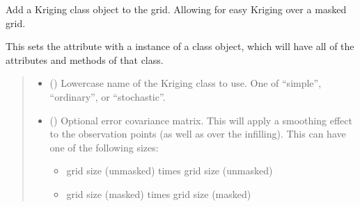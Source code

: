 \documentclass[letterpaper,10pt,english]{sphinxmanual}
\begin{document}
\begin{fulllineitems}
\begin{fulllineitems}
\end{fulllineitems}


\begin{fulllineitems}
\label{\detokenize{grid:glomar_gridding.grid.Grid.kriging}}
\pysigstartsignatures
\pysiglinewithargsret
{}
{\sphinxparamcomma {}}
{}
\pysigstopsignatures
\sphinxAtStartPar
Add a Kriging class object to the grid. Allowing for easy Kriging over
a masked grid.

\sphinxAtStartPar
This sets the  attribute with a instance of a
 class object, which will have
all of the attributes and methods of that class.
\begin{quote}\begin{description}
\begin{itemize}
\item {}
\sphinxAtStartPar
{} () \textendash{} Lower\sphinxhyphen{}case name of the Kriging class to use. One of “simple”,
“ordinary”, or “stochastic”.

\item {}
\sphinxAtStartPar
{} () \textendash{}
\sphinxAtStartPar
Optional error covariance matrix. This will apply a smoothing
effect to the observation points (as well as over the infilling).
This can have one of the following sizes:
\begin{itemize}
\item {}
\sphinxAtStartPar
grid size (unmasked) times grid size (unmasked)

\item {}
\sphinxAtStartPar
grid size (masked) times grid size (masked)


\end{itemize}
\end{itemize}
\end{description}
\end{quote}
\end{fulllineitems}
\end{fulllineitems}
\end{document}
